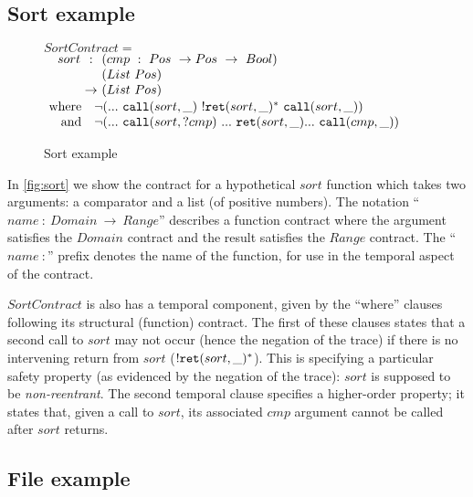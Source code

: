 \documentclass[preprint,onecolumn,9pt]{sigplanconf} %
\begin{document}
\subsection{Sort example} \label{sec:sort}

\renewcommand*{\arraystretch}{1.2}
\newcommand*{\call}[1]{\scallev{#1}{\_}}
\newcommand*{\ret}[1]{\sretev{#1}{\_}}
\begin{figure}
 $SortContract = $ \\
 $\begin{array}{ @{\quad}l@{\ } c @{\ }l }
 sort &:   &(cmp\ :\ Pos\ \to Pos\ \to\ Bool) \\
      &    &(List\ Pos) \\
      &\to &(List\ Pos) \\
 \end{array}$
 $\begin{array}{ @{~}r@{} l @{}l }
  \text{where}\quad
  &\stnot{(&\sddd~ \call{sort}~ \stmany{\snonevent{\ret{sort}}}~ \call{sort})} \\
  \text{and}\quad
  &\stnot{(&\sddd~ \scallev{sort}{?cmp}~ \sddd~ \ret{sort} \sddd~ \call{cmp})}
 \end{array}$
 \caption{Sort example}
 \label{fig:sort}
\end{figure}

In \autoref{fig:sort} we show the contract for a hypothetical $sort$ function which takes two arguments: a comparator and a list (of positive numbers).
%
The notation ``$name\ :\ Domain\ \to\ Range$'' describes a function contract where the argument satisfies the $Domain$ contract and the result satisfies the $Range$ contract.
%
The ``$name\ :$'' prefix denotes the name of the function, for use in the temporal aspect of the contract.

$SortContract$ is also has a temporal component, given by the ``where'' clauses following its structural (function) contract.
%
The first of these clauses states that a second call to $sort$ may not occur (hence the negation of the trace) if there is no intervening return from $sort$ ($\stmany{\snonevent{\ret{sort}}}$).
%
This is specifying a particular safety property (as evidenced by the negation of the trace): $sort$ is supposed to be \emph{non-reentrant}.
%
The second temporal clause specifies a higher-order property; it states that, given a call to $sort$, its associated $cmp$ argument cannot be called after $sort$ returns.

\subsection{File example}
\end{document}
